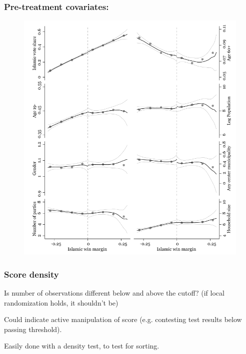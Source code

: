 \documentclass[12pt,english,dvipsnames,aspectratio=169,handout]{beamer}\usepackage[]{graphicx}\usepackage[]{xcolor}
\begin{document}
\begin{frame}
\frametitle{Pre-treatment covariates: }

\begin{figure}
\centering
\includegraphics[scale=0.3]{../04-figures/07/13.PNG}
\end{figure}

\end{frame}


\begin{frame}
\frametitle{Score density}
Is number of observations different below and above the cutoff? (if local randomization holds, it shouldn't be)\bigskip
\pause

Could indicate active manipulation of score (e.g. contesting test results below passing threshold).\bigskip
\pause

Easily done with a density test, to test for sorting.

\end{frame}
\end{document}
